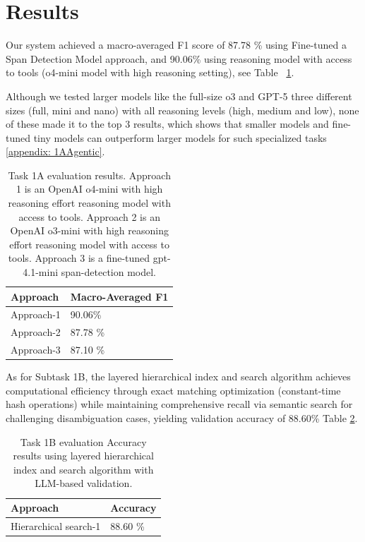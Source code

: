 \documentclass[11pt]{article}
\begin{document}
\section{Results}
Our system achieved a macro-averaged F1 score of 87.78 \% using Fine-tuned a Span Detection Model approach, and 90.06\% using reasoning model with access to tools (o4-mini model with high reasoning setting), see Table ~\ref{tab:1A}.

Although we tested larger models like the full-size o3 and GPT-5 three different sizes (full, mini and nano) with all reasoning levels (high, medium and low), none of these made it to the top 3 results, which shows that smaller models and fine-tuned tiny models can outperform larger models for such specialized tasks \ref{appendix: 1AAgentic}.


\begin{table}[H]
  \begin{tabular}{ll}
    \hline
    \textbf{Approach}           & \textbf{Macro-Averaged F1}  \\
    \hline
    Approach-1        & 90.06\%                                     \\
    Approach-2        & 87.78 \%                                        \\    Approach-3        & 87.10 \%                                        \\
    \hline
  \end{tabular}
  \caption{\label{tab:1A}
    Task 1A evaluation results. Approach 1 is an OpenAI o4-mini with high reasoning effort reasoning model with access to tools. Approach 2 is an OpenAI o3-mini with high reasoning effort reasoning model with access to tools.  Approach 3 is a fine-tuned gpt-4.1-mini span-detection model.
  }
\end{table}
As for Subtask 1B, the layered hierarchical index and search algorithm achieves computational efficiency through exact matching optimization (constant-time hash operations) while maintaining comprehensive recall via semantic search for challenging disambiguation cases, yielding validation accuracy of 88.60\% Table \ref{tab:1B}.
\begin{table}[H]
  \begin{tabular}{ll}
    \hline
    \textbf{Approach}           & \textbf{Accuracy}  \\
    \hline
    Hierarchical search-1       &     88.60 \%        \\
    \hline
  \end{tabular}
  \caption{\label{tab:1B}
    Task 1B evaluation Accuracy results using layered hierarchical index and search algorithm with LLM-based validation.
  }
\end{table}
\end{document}
